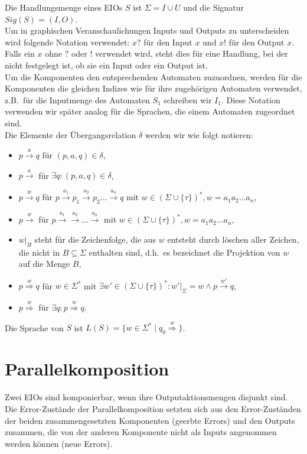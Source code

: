 Die Handlungsmenge eines EIOs $S$ ist $\Sigma = I\cup U$ und die Signatur
$Sig(S)=(I,O)$.\\
Um in graphischen Veranschaulichungen Inputs und Outputs zu unterscheiden wird
folgende Notation verwendet: $x?$ für den Input $x$ und $x!$ für den Output
$x$. Falls ein $x$ ohne $?$ oder $!$ verwendet wird, steht dies für eine
Handlung, bei der nicht festgelegt ist, ob sie ein Input oder ein Output ist.\\
Um die Komponenten den entsprechenden Automaten zuzuordnen, werden für
die Komponenten die gleichen Indizes wie für ihre zugehörigen Automaten
verwendet, z.B.\ für die Inputmenge des Automaten $S_1$ schreiben wir $I_1$.
Diese Notation verwenden wir später analog für die Sprachen, die einem
Automaten zugeordnet sind.\\
Die Elemente der Übergangsrelation $\delta$ werden wir wie folgt notieren:
\begin{itemize}
  \item $p\overset{a}{\rightarrow} q$ für $(p,a,q)\in\delta$,
  \item $p\overset{a}{\rightarrow}$ für $\exists q: (p,a,q)\in\delta$,
  \item $p\overset{w}{\rightarrow} q$ für $p \overset{a_1}{\rightarrow} p_1
    \overset{a_2}{\rightarrow} p_2\dots \overset{a_n}{\rightarrow} q$ mit $w\in
    (\Sigma\cup\{\tau\})^*, w=a_1a_2\dots a_n$,
  \item $p\overset{w}{\rightarrow}$ für $p \overset{a_1}{\rightarrow}
    \overset{a_2}{\rightarrow} \dots \overset{a_n}{\rightarrow}$ mit $w\in
    (\Sigma\cup\{\tau\})^*, w=a_1a_2\dots a_n$,
  \item $w|_B$ steht für die Zeichenfolge, die aus $w$ entsteht durch löschen
    aller Zeichen, die nicht in $B\subseteq\Sigma$ enthalten sind, d.h.\ es
    bezeichnet die Projektion von $w$ auf die Menge $B$,
  \item $p\overset{w}{\Rightarrow} q$ für $w\in\Sigma^*$ mit $\exists
    w'\in(\Sigma\cup\{\tau\})^*:w'|_{\Sigma}=w\wedge p\overset{w'}{\rightarrow}
    q$,
  \item $p\overset{w}{\Rightarrow}$ für $\exists q:p\overset{w}{\Rightarrow}
    q$.
\end{itemize}
Die Sprache von $S$ ist
$L(S)=\{w\in\Sigma^*\mid q_0\overset{w}{\Rightarrow}\}$.

\section{Parallelkomposition}
Zwei EIOs sind komponierbar, wenn ihre Outputaktionsmengen disjunkt sind. Die
Error-Zustände der Parallelkomposition setzten sich aus den Error-Zuständen der
beiden zusammengesetzten Komponenten (geerbte Errors) und den Outputs zusammen, die von der
anderen Komponente nicht als Inputs angenommen werden können (neue Errors).

